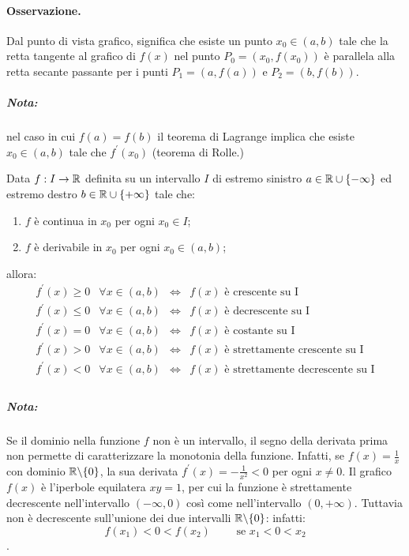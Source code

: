 \paragraph{Osservazione.}
Dal punto di vista grafico, significa che esiste un punto $x_0\in(a,b)$ tale che la retta tangente al grafico di $f(x)$ nel punto $P_0=(x_0,f(x_0))$ è parallela alla retta secante passante per i punti $P_1=(a,f(a))$ e $P_2=(b,f(b))$.

\subparagraph{Nota:} nel caso in cui $f(a)=f(b)$ il teorema di Lagrange implica che esiste $x_0\in (a,b)$ tale che $f^\prime(x_0)$ (teorema di Rolle.)

\begin{teo}
Data $f:I\rightarrow\mathbb{R}$ definita su un intervallo $I$ di estremo sinistro $a\in\mathbb{R}\cup\{-\infty\}$ ed estremo destro $b\in\mathbb{R}\cup\{+\infty\}$ tale che:
\begin{enumerate}
\item $f$ è continua in $x_0$ per ogni $x_0 \in I$;
\item $f$ è derivabile in $x_0$ per ogni $x_0\in (a,b)$;
\end{enumerate}
allora:
\begin{equation*}
\begin{array}{ *{4}{c} }
f^\prime(x) \geq 0 & \forall x \in (a,b) & \Leftrightarrow & f(x) \text{ è crescente su I} \\
f^\prime(x) \leq 0 & \forall x \in (a,b) & \Leftrightarrow & f(x) \text{ è decrescente su I} \\
f^\prime(x) = 0 & \forall x \in (a,b) & \Leftrightarrow & f(x) \text{ è costante su I} \\
f^\prime(x) > 0 & \forall x \in (a,b) & \Leftrightarrow & f(x) \text{ è strettamente crescente su I} \\
f^\prime(x) < 0 & \forall x \in (a,b) & \Leftrightarrow & f(x) \text{ è strettamente decrescente su I} \\
\end{array}
\end{equation*}
\subparagraph{Nota:} Se il dominio nella funzione $f$ non è un intervallo, il segno della derivata prima non permette di caratterizzare la monotonia della funzione. Infatti, se $f(x)=\frac{1}{x}$ con dominio $\mathbb{R} \backslash \{0\}$, la sua derivata $f^\prime(x)=-\frac{1}{x^2}<0$ per ogni $x\neq 0$. Il grafico $f(x)$ è l'iperbole equilatera $xy=1$, per cui la funzione è strettamente decrescente nell'intervallo $(-\infty,0)$ così come nell'intervallo $(0,+\infty)$. Tuttavia non è decrescente sull'unione dei due intervalli $\mathbb{R} \backslash \{0\}$: infatti:
\[f(x_1)<0<f(x_2) \qquad \text{ se } x_1<0<x_2\].
\end{teo}

